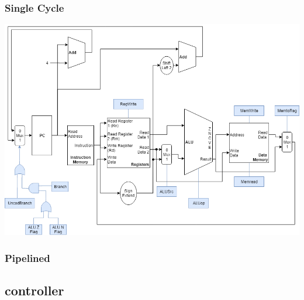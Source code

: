 \documentclass[a4paper,14pt]{article}
\begin{document}
\subsubsection{Single Cycle}
\begin{center}
\includegraphics[width=1\linewidth]{SingleCycleArch.png}
\end{center}

\subsubsection{Pipelined}
\subsection{controller}
\end{document}
